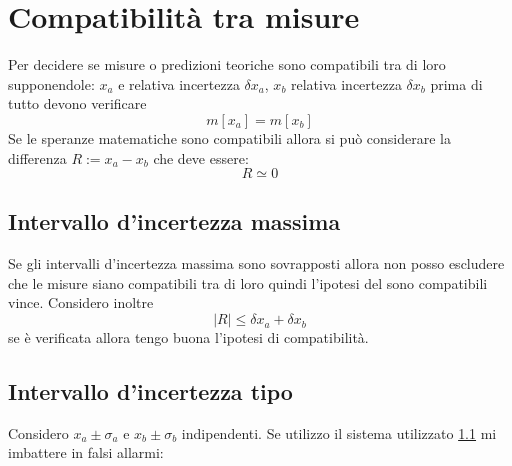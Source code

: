 \documentclass[11pt,a4paper]{book}
\begin{document}
\section{Compatibilità tra misure} 
Per decidere se misure o predizioni teoriche sono compatibili tra di loro supponendole: $ x_a $ e relativa incertezza $ \delta x_a $, $ x_b $ relativa incertezza $ \delta x_b $  prima di tutto devono verificare
\begin{equation}
m[x_a] = m[x_b]
\end{equation}
Se le speranze matematiche sono compatibili allora si può considerare la differenza $ R:= x_a - x_b $ che deve essere:
\begin{equation}
R \simeq 0
\end{equation}
\subsection{Intervallo d'incertezza massima} \label{subsec_2.3.1}
Se gli intervalli d'incertezza massima sono sovrapposti allora non posso escludere che le misure siano compatibili tra di loro quindi l'ipotesi del sono compatibili vince. Considero inoltre
\begin{equation}
\lvert R \rvert \leq \delta x_a + \delta x_b
\end{equation}
se è verificata allora tengo buona l'ipotesi di compatibilità.
\subsection{Intervallo d'incertezza tipo}
Considero $ x_a \pm \sigma_a $ e $ x_b \pm \sigma_b $ indipendenti. Se utilizzo il sistema utilizzato \ref{subsec_2.3.1} mi imbattere in falsi allarmi:
\end{document}
